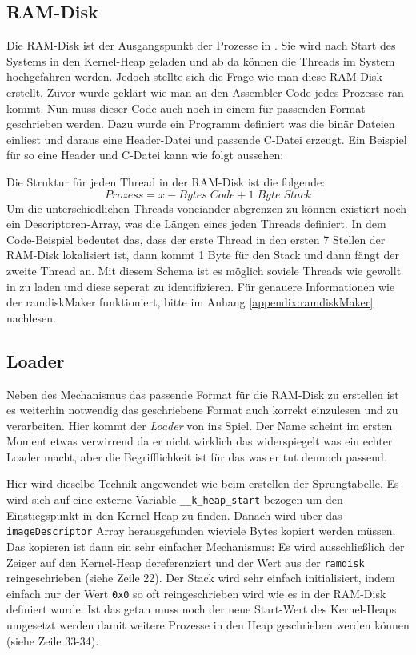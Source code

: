 \subsection{RAM-Disk}
Die RAM-Disk ist der Ausgangspunkt der Prozesse in \mops. Sie wird nach Start des Systems in den Kernel-Heap geladen und ab da k\"onnen die Threads im System hochgefahren werden. Jedoch stellte sich die Frage wie man diese RAM-Disk erstellt. Zuvor wurde gekl\"art wie man an den Assembler-Code jedes Prozesse ran kommt. Nun muss dieser Code auch noch in einem f\"ur \mops passenden Format geschrieben werden. Dazu wurde ein Programm definiert was die bin\"ar Dateien einliest und daraus eine Header-Datei und passende C-Datei erzeugt. Ein Beispiel f\"ur so eine Header und C-Datei kann wie folgt aussehen:

\newpage

Die Struktur f\"ur jeden Thread in der RAM-Disk ist die folgende:
$$Prozess = x-Bytes\;Code + 1\;Byte\;Stack$$
Um die unterschiedlichen Threads voneiander abgrenzen zu k\"onnen existiert noch ein Descriptoren-Array, was die L\"angen eines jeden Threads definiert. In dem Code-Beispiel bedeutet das, dass der erste Thread in den ersten 7 Stellen der RAM-Disk lokalisiert ist, dann kommt 1 Byte f\"ur den Stack und dann f\"angt der zweite Thread an. Mit diesem Schema ist es m\"oglich soviele Threads wie gewollt in \mops zu laden und diese seperat zu identifizieren. F\"ur genauere Informationen wie der ramdiskMaker funktioniert, bitte im Anhang \ref{appendix:ramdiskMaker} nachlesen.
\subsection{\mops Loader}
Neben des Mechanismus das passende Format f\"ur die RAM-Disk zu erstellen ist es weiterhin notwendig das geschriebene Format auch korrekt einzulesen und zu verarbeiten. Hier kommt der \textit{Loader} von \mops ins Spiel. Der Name scheint im ersten Moment etwas verwirrend da er nicht wirklich das widerspiegelt was ein echter Loader macht, aber die Begrifflichkeit ist f\"ur das was er tut dennoch passend. 

Hier wird dieselbe Technik angewendet wie beim erstellen der Sprungtabelle. Es wird sich auf eine externe Variable \texttt{\_\_k\_heap\_start} bezogen um den Einstiegspunkt in den Kernel-Heap zu finden. Danach wird \"uber das \texttt{imageDescriptor} Array herausgefunden wieviele Bytes kopiert werden m\"ussen. Das kopieren ist dann ein sehr einfacher Mechanismus: Es wird ausschlie\ss lich der Zeiger auf den Kernel-Heap dereferenziert und der Wert aus der \texttt{ramdisk} reingeschrieben (siehe Zeile 22). Der Stack wird sehr einfach initialisiert, indem einfach nur der Wert \texttt{0x0} so oft reingeschrieben wird wie es in der RAM-Disk definiert wurde. Ist das getan muss noch der neue Start-Wert des Kernel-Heaps umgesetzt werden damit weitere Prozesse in den Heap geschrieben werden k\"onnen (siehe Zeile 33-34).
